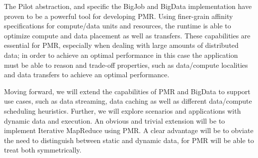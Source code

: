 \documentclass{acm_proc_article-sp}
\newcommand{\jhanote}[1]{ {\textcolor{red} { ***SJ: #1 }}}
\newcommand{\jhanote}[1]{}
\newcommand{\upp}{\vspace*{-0.5em}}
\begin{document}
The Pilot abstraction, and specific the BigJob and BigData
implementation have proven to be a powerful tool for developing
PMR. Using finer-grain affinity specifications for compute/data units
and resources, the runtime is able to optimize compute and data
placement as well as transfers. These capabilities are essential for
PMR, especially when dealing with large amounts of distributed data;
in order to achieve an optimal performance in this case the
application must be able to reason and trade-off properties, such as
data/compute localities and data transfers to achieve an optimal
performance.

Moving forward, we will extend the capabilities of PMR and BigData to
support use cases, such as data streaming, data caching as well as
different data/compute scheduling heuristics. Further, we will explore
scenarios and applications with dynamic data and execution. An obvious
and trivial extension will be to implement Iterative MapReduce using
PMR. A clear advantage will be to obviate the need to distinguish
between static and dynamic data, for PMR will be able to treat both
symmetrically.  \upp





%
%
%
\end{document}
